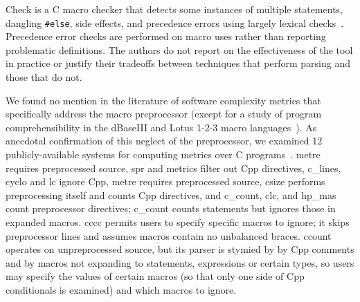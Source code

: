 \documentclass[10pt]{article}
\newcommand{\pkg}[1]{\textsf{#1}}
\begin{document}
Check is a C macro checker that detects some instances of multiple
statements, dangling {\tt \#else}, side effects, and precedence errors
using largely lexical checks~\cite{SpulerS92}.  Precedence error checks are
performed on macro uses rather than reporting problematic definitions.  The
authors do not report on the effectiveness of the tool in practice or
justify their tradeoffs between techniques that perform parsing and those
that do not.


We found no mention in the literature of software complexity metrics that
specifically address the macro preprocessor (except for a study of program
comprehensibility in the dBaseIII and Lotus 1-2-3 macro
languages~\cite{DavisDL90}).  As anecdotal confirmation of this neglect of
the preprocessor, we examined 12 publicly-available systems for computing
metrics over C programs~\cite{Lott-metrics-tools}.
\pkg{metre} requires preprocessed source, \pkg{spr} and \pkg{metrics}
filter out Cpp directives, \pkg{c\_lines}, \pkg{cyclo} and \pkg{lc} ignore
Cpp, \pkg{metre} requires preprocessed source, \pkg{csize} performs
preprocessing itself and counts Cpp directives, and \pkg{c\_count},
\pkg{clc}, and \pkg{hp\_mas} count preprocessor directives;
\pkg{c\_count} counts statements but ignores those in expanded macros.
\pkg{cccc} permits users to specify specific macros to ignore; it skips
preprocessor lines and assumes macros contain no unbalanced braces.
\pkg{ccount} operates on unpreprocessed source, but its parser is stymied
by by Cpp comments and by macros not expanding to statements, expressions
or certain types, so users may specify the values of certain macros (so
that only one side of Cpp conditionals is examined) and which macros to
ignore.

\end{document}
